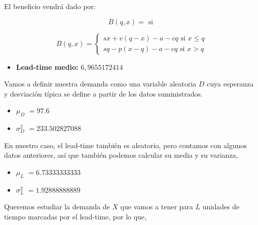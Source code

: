 \documentclass[a4paper,12pt]{article}
\begin{document}
El beneficio vendr\'a dado por:

$$ B(q,x) = \text{ si }$$

	\begin{equation*}
	B(q,x) = \left\lbrace \begin{array}{l}
		sx + v(q - x) - a - cq \text{ si } x\leq q \\
		sq - p(x - q) - a - cq \text{ si } x > q
	\end{array}
	\right. 
	\end{equation*}
	
\begin{itemize}

\item[] \textbf{Lead-time medio:} $6,9655172414$
\end{itemize}




Vamos a definir nuestra demanda como una variable aleatoria $D$ cuya esperanza y desviaci\'on t\'ipica se define a partir de los datos suministrados.

\begin{itemize}
\item[] \textbf{$\mu_D$} $= 97.6$
\item[] \textbf{$\sigma_D^2$} $= 233.502827088$
\end{itemize}

En nuestro caso, el lead-time tambi\'en es aleatorio, pero contamos con algunos datos anteriores, as\'i que tambi\'en podemos calcular su media y su varianza,

\begin{itemize}
\item[] \textbf{$\mu_L$} $= 6.73333333333$
\item[] \textbf{$\sigma_L^2$} $= 1.92888888889$
\end{itemize}



Queremos estudiar la demanda de $X$ que vamos a tener para $L$ unidades de tiempo marcadas por el lead-time, por lo que,
\end{document}
